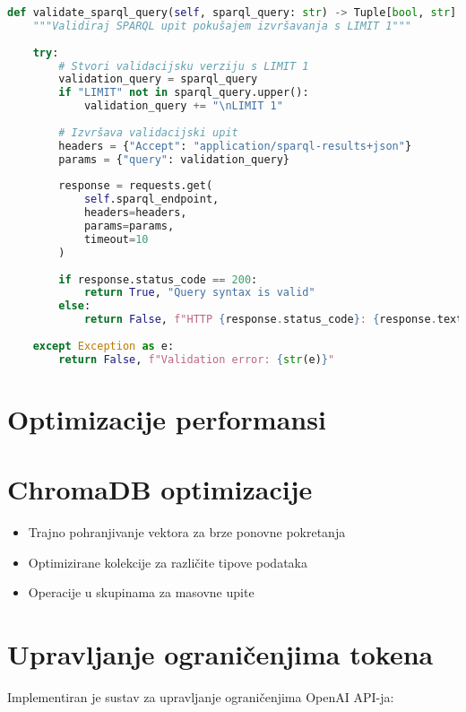 \begin{lstlisting}[language=Python, caption=SPARQL validacija]
def validate_sparql_query(self, sparql_query: str) -> Tuple[bool, str]:
    """Validiraj SPARQL upit pokušajem izvršavanja s LIMIT 1"""
    
    try:
        # Stvori validacijsku verziju s LIMIT 1
        validation_query = sparql_query
        if "LIMIT" not in sparql_query.upper():
            validation_query += "\nLIMIT 1"
        
        # Izvršava validacijski upit
        headers = {"Accept": "application/sparql-results+json"}
        params = {"query": validation_query}
        
        response = requests.get(
            self.sparql_endpoint, 
            headers=headers, 
            params=params, 
            timeout=10
        )
        
        if response.status_code == 200:
            return True, "Query syntax is valid"
        else:
            return False, f"HTTP {response.status_code}: {response.text[:200]}"
            
    except Exception as e:
        return False, f"Validation error: {str(e)}"
\end{lstlisting}

\section{Optimizacije performansi}
\label{sec:performance}

\section{ChromaDB optimizacije}
\label{sec:chromadb_optimizations}

\begin{itemize}
    \item Trajno pohranjivanje vektora za brze ponovne pokretanja
    \item Optimizirane kolekcije za različite tipove podataka
    \item Operacije u skupinama za masovne upite
\end{itemize}

\section{Upravljanje ograničenjima tokena}
\label{sec:token_management}

Implementiran je sustav za upravljanje ograničenjima OpenAI API-ja:

